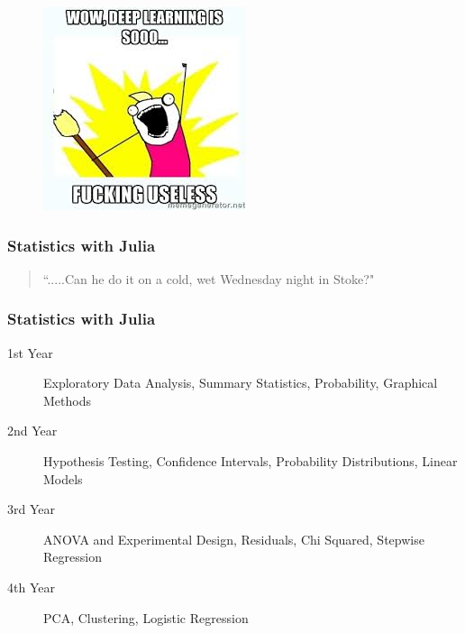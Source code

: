 \documentclass[Master.tex]{subfiles}
\begin{document}
\begin{frame}
	\begin{figure}
\centering
\includegraphics[width=0.7\linewidth]{images/DeepLearningUseless}
\caption{}
\label{fig:DeepLearningUseless}
\end{figure}

\end{frame}	
\begin{frame}
	\frametitle{Statistics with Julia}
	\Large
	\begin{quote}
		``.....Can he do it on a cold, wet Wednesday night in Stoke?"
	\end{quote}
\end{frame}
\begin{frame}
	\frametitle{Statistics with Julia}
	\large
	\begin{description}
		\item[1st Year]	Exploratory Data Analysis,	Summary Statistics, Probability, Graphical Methods \smallskip
		\item[2nd Year]	Hypothesis Testing, Confidence Intervals, Probability Distributions, Linear Models \smallskip
		\item[3rd Year] ANOVA and Experimental Design, Residuals, Chi Squared, Stepwise Regression \smallskip
		\item[4th Year] PCA, Clustering, Logistic Regression
	\end{description}
\end{frame}	
\end{document}
